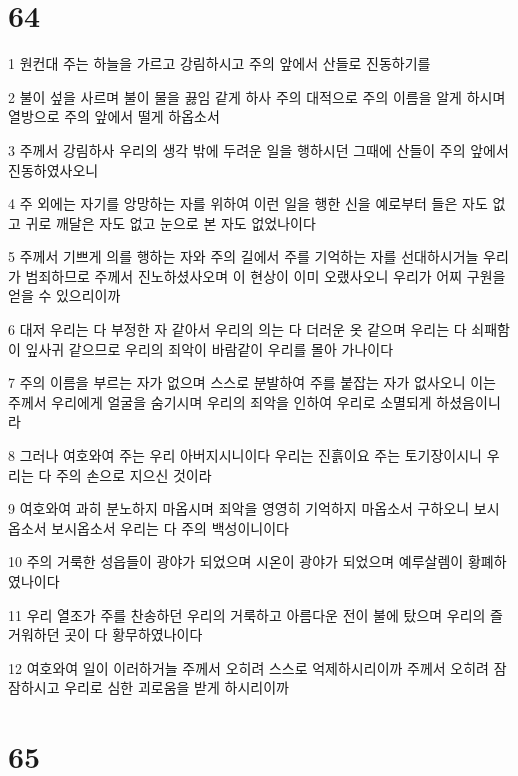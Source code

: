 \chapter{64}

\par 1 원컨대 주는 하늘을 가르고 강림하시고 주의 앞에서 산들로 진동하기를
\par 2 불이 섶을 사르며 불이 물을 끓임 같게 하사 주의 대적으로 주의 이름을 알게 하시며 열방으로 주의 앞에서 떨게 하옵소서
\par 3 주께서 강림하사 우리의 생각 밖에 두려운 일을 행하시던 그때에 산들이 주의 앞에서 진동하였사오니
\par 4 주 외에는 자기를 앙망하는 자를 위하여 이런 일을 행한 신을 예로부터 들은 자도 없고 귀로 깨달은 자도 없고 눈으로 본 자도 없었나이다
\par 5 주께서 기쁘게 의를 행하는 자와 주의 길에서 주를 기억하는 자를 선대하시거늘 우리가 범죄하므로 주께서 진노하셨사오며 이 현상이 이미 오랬사오니 우리가 어찌 구원을 얻을 수 있으리이까
\par 6 대저 우리는 다 부정한 자 같아서 우리의 의는 다 더러운 옷 같으며 우리는 다 쇠패함이 잎사귀 같으므로 우리의 죄악이 바람같이 우리를 몰아 가나이다
\par 7 주의 이름을 부르는 자가 없으며 스스로 분발하여 주를 붙잡는 자가 없사오니 이는 주께서 우리에게 얼굴을 숨기시며 우리의 죄악을 인하여 우리로 소멸되게 하셨음이니라
\par 8 그러나 여호와여 주는 우리 아버지시니이다 우리는 진흙이요 주는 토기장이시니 우리는 다 주의 손으로 지으신 것이라
\par 9 여호와여 과히 분노하지 마옵시며 죄악을 영영히 기억하지 마옵소서 구하오니 보시옵소서 보시옵소서 우리는 다 주의 백성이니이다
\par 10 주의 거룩한 성읍들이 광야가 되었으며 시온이 광야가 되었으며 예루살렘이 황폐하였나이다
\par 11 우리 열조가 주를 찬송하던 우리의 거룩하고 아름다운 전이 불에 탔으며 우리의 즐거워하던 곳이 다 황무하였나이다
\par 12 여호와여 일이 이러하거늘 주께서 오히려 스스로 억제하시리이까 주께서 오히려 잠잠하시고 우리로 심한 괴로움을 받게 하시리이까

\chapter{65}

